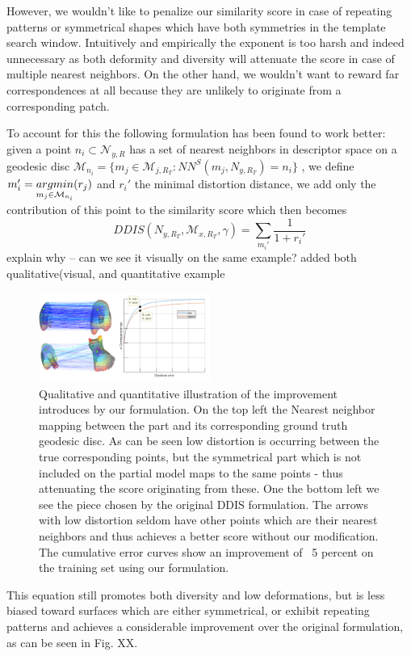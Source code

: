 \documentclass[10pt,twocolumn,letterpaper]{article}
\begin{document}
However, we wouldn't like to penalize our similarity score in case of repeating patterns or symmetrical shapes which have both symmetries in the template search window. Intuitively and empirically the exponent is too harsh and indeed unnecessary as both deformity and diversity will attenuate the score in case of multiple nearest neighbors. On the other hand, we wouldn't want to reward far correspondences at all because they are unlikely to originate from a corresponding patch. 



To account for this the following formulation has been found to work better: given a point $n_i\subset \mathcal{N}_{y,R}$ has a set of nearest neighbors in descriptor space on a geodesic disc 
$\mathcal{M}_{n_i}=\{m_j\in\mathcal{M}_{j,R_T}:NN^S(m_j,N_{y,R_T})=n_i\}$ 
, we define 
$m_i' = \underset{m_j\in\mathcal{M}_{n_i}}{argmin}\space (r_j)$
and $r_i'$ the minimal distortion distance, we add only the contribution of this point to the similarity score which then becomes
\begin{equation}
DDIS(N_{y,R_T},\mathcal{M}_{x,R_T},\gamma)=\sum_{m_i'}\frac{1}{1+r_i'}
\end{equation}
{\color{red} explain why -- can we see it visually on the same example?}{\color{green} added both qualitative(visual, and quantitative example}\\
\begin{figure}[htb]
	\includegraphics[width=0.5\textwidth]{figures/DDISvsWDIS.png}
	\caption{Qualitative and quantitative illustration of the improvement introduces by our formulation. On the top left the Nearest neighbor mapping between the part and its corresponding ground truth geodesic disc. As can be seen low distortion is occurring between the true corresponding points, but the symmetrical part which is not included on the partial model maps to the same points - thus attenuating the score originating from these. One the bottom left we see the piece chosen by the original DDIS formulation. The arrows with low distortion seldom have other points which are their nearest neighbors and thus achieves a better score without our modification. The cumulative error curves show an improvement of ~5 percent on the training set using our formulation.}
\end{figure}
This equation still promotes both diversity and low deformations, but is less biased toward surfaces which are either symmetrical, or exhibit repeating patterns and achieves a considerable improvement over the original formulation, as can be seen in Fig. XX.
\end{document}
